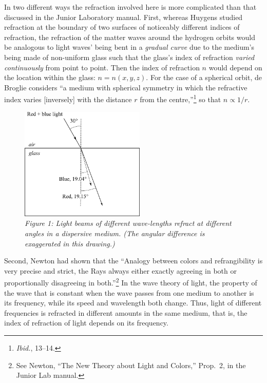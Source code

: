 In two different ways the refraction involved here is more complicated
than that discussed in the Junior Laboratory manual. First, whereas
Huygens studied refraction at the boundary of two surfaces of noticeably
different indices of refraction, the refraction of the matter waves
around the hydrogen orbits would be analogous to light waves' being bent
in a \emph{gradual curve} due to the medium's being made of
non-uniform glass such that the glass's index of refraction
\emph{varied continuously} from point to point. Then the index of
refraction $n$ would depend on the location within the glass:
$n = n(x,y,z)$. For the case of a spherical orbit, de
Broglie considers ``a medium with spherical symmetry in which the
refractive index varies {[}inversely{]} with the distance $r$ from
the centre,''\footnote{\emph{Ibid.}, 13--14.} so that $n \propto 1/r$.

\begin{figure} %
\centering
    \includegraphics[width=2.338in,height=2.117in]{images/08_debroglie/refraction.png}
    \caption*{\emph{Figure 1: Light beams of different wave-lengths refract at different
    angles in a dispersive medium. (The angular difference is exaggerated in
    this drawing.)}}
\end{figure}


Second, Newton had shown that the ``Analogy between colors and
refrangibility is very precise and strict, the Rays always either exactly agreeing
in both or proportionally disagreeing in both.''\footnote{See Newton,
``The New Theory about Light and Colors,'' Prop.\ 2, in the Junior Lab manual.} 
In the wave theory of light, the property of the wave that is
constant when the wave passes from one medium to another is its
frequency, while its speed and wavelength both change. Thus, light of
different frequencies is refracted in different amounts in the same
medium, that is, the index of refraction of light depends on its
frequency.



